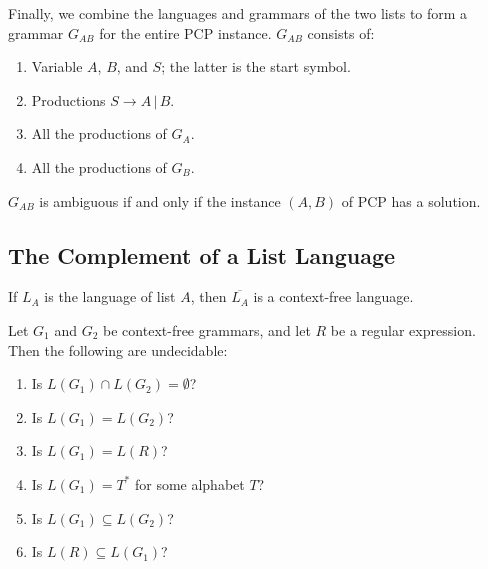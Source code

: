 \documentclass[]{article}
\begin{document}
Finally, we combine the languages and grammars of the two lists to form a
grammar $G_{AB}$ for the entire PCP instance. $G_{AB}$ consists of:
\begin{enumerate}
\item Variable $A$, $B$, and $S$; the latter is the start symbol.
\item Productions $S \rightarrow A\,|\,B$.
\item All the productions of $G_A$.
\item All the productions of $G_B$.
\end{enumerate}
$G_{AB}$ is ambiguous if and only if the instance $(A, B)$ of PCP has a
solution.

\subsection*{The Complement of a List Language}
\begin{thm}
If $L_A$ is the language of list $A$, then $\overline{L_A}$ is a context-free
language.
\end{thm}
\begin{thm}
Let $G_1$ and $G_2$ be context-free grammars, and let $R$ be a regular
expression. Then the following are undecidable:
\begin{enumerate}
\item Is $L(G_1) \cap L(G_2) = \emptyset$?
\item Is $L(G_1) = L(G_2)$?
\item Is $L(G_1) = L(R)$?
\item Is $L(G_1) = T^*$ for some alphabet $T$?
\item Is $L(G_1) \subseteq L(G_2)$?
\item Is $L(R) \subseteq L(G_1)$?
\end{enumerate}
\end{thm}
\end{document}
